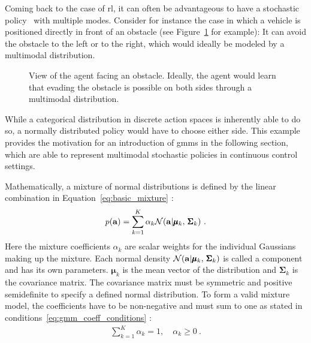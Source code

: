 Coming back to the case of \gls{rl}, it can often be advantageous to have a stochastic policy \piplain\ with multiple modes. Consider for instance the case in which a vehicle is positioned directly in front of an obstacle (see Figure~\ref{fig:agent_view_maze} for example): It can avoid the obstacle to the left or to the right, which would ideally be modeled by a multimodal distribution.
\begin{figure}[t]
	\centering
	\captionsetup{justification=centering}
	\scalebox{0.6}{
    
    }
	\caption[Agent view maze]{View of the agent facing an obstacle. Ideally, the agent would learn that evading the obstacle is possible on both sides through a multimodal distribution.}
\label{fig:agent_view_maze}
\end{figure}
While a categorical distribution in discrete action spaces is inherently able to do so, a normally distributed policy would have to choose either side. This example provides the motivation for an introduction of \glspl{gmm} in the following section, which are able to represent multimodal stochastic policies in continuous control settings.

Mathematically, a mixture of normal distributions is defined by the linear combination in Equation~\ref{eq:basic_mixture} \cite{bishopPatternRecognitionMachine2006}:
\begin{gather}\label{eq:basic_mixture}
    p(\mathbf a) = \sum_{k=1}^K \alpha_k \mathcal{N}(\mathbf a | \pmb \mu_k, \, \pmb \Sigma_k)~.
\end{gather}
Here the mixture coefficients $\alpha_k$ are scalar weights for the individual Gaussians making up the mixture. Each normal density $\mathcal{N}(\mathbf a | \pmb \mu_k, \, \pmb \Sigma_k)$ is called a component and has its own parameters. $\pmb \mu_k$ is the mean vector of the distribution and $\pmb \Sigma_k$ is the covariance matrix. The covariance matrix must be symmetric and positive semidefinite to specify a defined normal distribution. To form a valid mixture model, the coefficients have to be non-negative and must sum to one as stated in conditions~\ref{eq:gmm_coeff_conditions} \cite{bishopPatternRecognitionMachine2006}:
\begin{gather}\label{eq:gmm_coeff_conditions}
    \sum_{k=1}^K \alpha_k = 1, \quad \alpha_k \geq 0~.
\end{gather}

